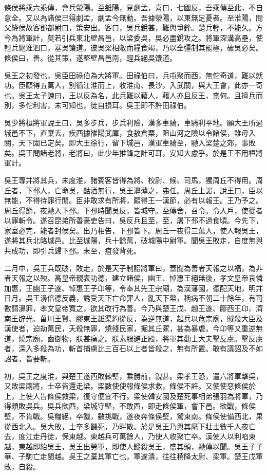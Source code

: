 條侯將乘六乘傳，會兵滎陽。至雒陽，見劇孟，喜曰，七國反，吾乘傳至此，不自意全。又以為諸侯已得劇孟，劇孟今無動。吾據滎陽，以東無足憂者。至淮陽，問父絳侯故客鄧都尉曰，策安出。客曰，吳兵銳甚，難與爭鋒。楚兵輕，不能久。方今為將軍計，莫若引兵東北壁昌邑，以梁委吳，吳必盡銳攻之。將軍深溝高壘，使輕兵絕淮泗口，塞吳馕道。彼吳梁相敝而糧食竭，乃以全彊制其罷極，破吳必矣。條侯曰，善。從其策，遂堅壁昌邑南，輕兵絕吳馕道。

吳王之初發也，吳臣田祿伯為大將軍。田祿伯曰，兵屯聚而西，無佗奇道，難以就功。臣願得五萬人，別循江淮而上，收淮南、長沙，入武關，與大王會，此亦一奇也。吳王太子諫曰，王以反為名，此兵難以藉人，藉人亦且反王，柰何。且擅兵而別，多佗利害，未可知也，徒自損耳。吳王即不許田祿伯。

吳少將桓將軍說王曰，吳多步兵，步兵利險，漢多車騎，車騎利平地。願大王所過城邑不下，直棄去，疾西據雒陽武庫，食敖倉粟，阻山河之險以令諸侯，雖毋入關，天下固已定矣。即大王徐行，留下城邑，漢軍車騎至，馳入梁楚之郊，事敗矣。吳王問諸老將，老將曰，此少年推鋒之計可耳，安知大慮乎。於是王不用桓將軍計。

吳王專并將其兵，未度淮，諸賓客皆得為將、校尉、候、司馬，獨周丘不得用。周丘者，下邳人，亡命吳，酤酒無行，吳王濞薄之，弗任。周丘上謁，說王曰，臣以無能，不得待罪行閒。臣非敢求有所將，願得王一漢節，必有以報王。王乃予之。周丘得節，夜馳入下邳。下邳時聞吳反，皆城守。至傳舍，召令。令入戶，使從者以罪斬令。遂召昆弟所善豪吏告曰，吳反兵且至，至，屠下邳不過食頃。今先下，家室必完，能者封侯矣。出乃相告，下邳皆下。周丘一夜得三萬人，使人報吳王，遂將其兵北略城邑。比至城陽，兵十餘萬，破城陽中尉軍。聞吳王敗走，自度無與共成功，即引兵歸下邳。未至，疽發背死。

二月中，吳王兵既破，敗走，於是天子制詔將軍曰，蓋聞為善者天報之以福，為非者天報之以殃。高皇帝親表功德，建立諸侯，幽王、悼惠王絕無後，孝文皇帝哀憐加惠，王幽王子遂、悼惠王子卬等，令奉其先王宗廟，為漢藩國，德配天地，明并日月。吳王濞倍德反義，誘受天下亡命罪人，亂天下幣，稱病不朝二十餘年，有司數請濞罪，孝文皇帝寬之，欲其改行為善。今乃與楚王戊、趙王遂、膠西王卬、濟南王辟光、菑川王賢、膠東王雄渠約從反，為逆無道，起兵以危宗廟，賊殺大臣及漢使者，迫劫萬民，夭殺無罪，燒殘民家，掘其丘冢，甚為暴虐。今卬等又重逆無道，燒宗廟，鹵御物，朕甚痛之。朕素服避正殿，將軍其勸士大夫擊反虜。擊反虜者，深入多殺為功，斬首捕虜比三百石以上者皆殺之，無有所置。敢有議詔及不如詔者，皆要斬。

初，吳王之度淮，與楚王遂西敗棘壁，乘勝前，銳甚。梁孝王恐，遣六將軍擊吳，又敗梁兩將，士卒皆還走梁。梁數使使報條侯求救，條侯不許。又使使惡條侯於上，上使人告條侯救梁，復守便宜不行。梁使韓安國及楚死事相弟張羽為將軍，乃得頗敗吳兵。吳兵欲西，梁城守堅，不敢西，即走條侯軍，會下邑。欲戰，條侯壁，不肯戰。吳糧絕，卒饑，數挑戰，遂夜奔條侯壁，驚東南。條侯使備西北，果從西北入。吳大敗，士卒多饑死，乃畔散。於是吳王乃與其麾下壯士數千人夜亡去，度江走丹徒，保東越。東越兵可萬餘人，乃使人收聚亡卒。漢使人以利啗東越，東越即紿吳王，吳王出勞軍，即使人鏦殺吳王，盛其頭，馳傳以聞。吳王子子華、子駒亡走閩越。吳王之棄其軍亡也，軍遂潰，往往稍降太尉、梁軍。楚王戊軍敗，自殺。

